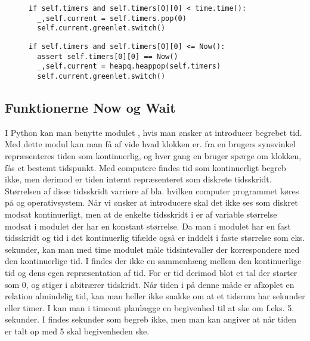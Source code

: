 \begin{figure}[hbtp]
\begin{minipage}[c]{\linewidth}
\begin{lstlisting}[firstnumber=204, label=sched_timer, caption=Udvælgelse af proces fra listen timers (fra scheduling.py)]
if self.timers and self.timers[0][0] < time.time():
  _,self.current = self.timers.pop(0)
  self.current.greenlet.switch()
\end{lstlisting}
\end{minipage}
\begin{minipage}[c]{\linewidth}
\begin{lstlisting}[firstnumber=124, label=sim_timer, caption=Udvælgelse af proces fra listen timers (fra simulation.py)]
if self.timers and self.timers[0][0] <= Now():
  assert self.timers[0][0] == Now()
  _,self.current = heapq.heappop(self.timers)
  self.current.greenlet.switch()
\end{lstlisting}
\end{minipage}
\end{figure}



\subsection{Funktionerne Now og Wait}
 I Python kan man benytte modulet
, hvis man ønsker at introducer begrebet tid. Med dette
modul kan man få af vide hvad klokken er. fra en brugers synsvinkel
repræsenteres tiden som kontinuerlig, og hver gang en bruger spørge
om klokken, fås et bestemt tidspunkt. Med computere findes tid som
kontinuerligt begreb ikke, men derimod er tiden internt repræsenteret
som diskrete tidsskridt. Størrelsen af disse tidsskridt varriere
af bla. hvilken computer programmet køres på og operativsystem.
Når vi ønsker at introducere \des skal det ikke ses som diskret
modsat kontinuerligt, men at de enkelte tidsskridt i \des er af
variable størrelse modsat i modulet  der har en konstant
størrelse. Da man i  modulet har en fast tidsskridt og
tid i det kontinuerlig tifælde også er inddelt i faste størrelse
som eks. sekunder, kan man med time modulet måle tidsintevaller der
korrespondere med den kontinuerlige tid. I \des findes der ikke en
sammenhæng mellem den kontinuerlige tid og dens egen repræsentation af
tid. For \des er tid derimod blot et tal der starter som 0, og stiger
i abitrærer tidskridt. Når tiden i \des på denne måde er afkoplet
en relation almindelig tid, kan man heller ikke snakke om at et tidsrum
har sekunder eller timer. I \pycsp kan man i timeout planlægge en
begivenhed til at ske om f.eks. 5. sekunder. I \des findes sekunder som
begreb ikke, men man kan angiver at når tiden er talt op med 5 skal
begivenheden ske. 

